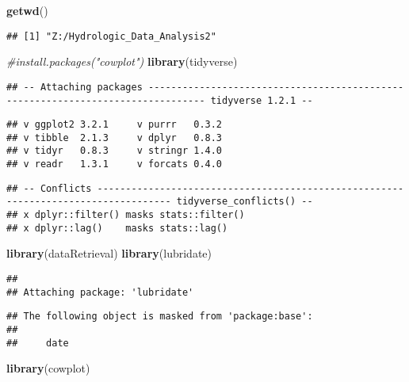\documentclass[]{article}
\newenvironment{Shaded}{\begin{snugshade}}{\end{snugshade}}
\newcommand{\CommentTok}[1]{\textcolor[rgb]{0.56,0.35,0.01}{\textit{#1}}}
\newcommand{\KeywordTok}[1]{\textcolor[rgb]{0.13,0.29,0.53}{\textbf{#1}}}
\newcommand{\NormalTok}[1]{#1}
\begin{document}
\begin{Shaded}
\begin{Highlighting}[]
\KeywordTok{getwd}\NormalTok{()}
\end{Highlighting}
\end{Shaded}

\begin{verbatim}
## [1] "Z:/Hydrologic_Data_Analysis2"
\end{verbatim}

\begin{Shaded}
\begin{Highlighting}[]
\CommentTok{#install.packages("cowplot")}
\KeywordTok{library}\NormalTok{(tidyverse)}
\end{Highlighting}
\end{Shaded}

\begin{verbatim}
## -- Attaching packages -------------------------------------------------------------------------------- tidyverse 1.2.1 --
\end{verbatim}

\begin{verbatim}
## v ggplot2 3.2.1     v purrr   0.3.2
## v tibble  2.1.3     v dplyr   0.8.3
## v tidyr   0.8.3     v stringr 1.4.0
## v readr   1.3.1     v forcats 0.4.0
\end{verbatim}

\begin{verbatim}
## -- Conflicts ----------------------------------------------------------------------------------- tidyverse_conflicts() --
## x dplyr::filter() masks stats::filter()
## x dplyr::lag()    masks stats::lag()
\end{verbatim}

\begin{Shaded}
\begin{Highlighting}[]
\KeywordTok{library}\NormalTok{(dataRetrieval)}
\KeywordTok{library}\NormalTok{(lubridate)}
\end{Highlighting}
\end{Shaded}

\begin{verbatim}
## 
## Attaching package: 'lubridate'
\end{verbatim}

\begin{verbatim}
## The following object is masked from 'package:base':
## 
##     date
\end{verbatim}

\begin{Shaded}
\begin{Highlighting}[]
\KeywordTok{library}\NormalTok{(cowplot)}
\end{Highlighting}
\end{Shaded}
\end{document}
